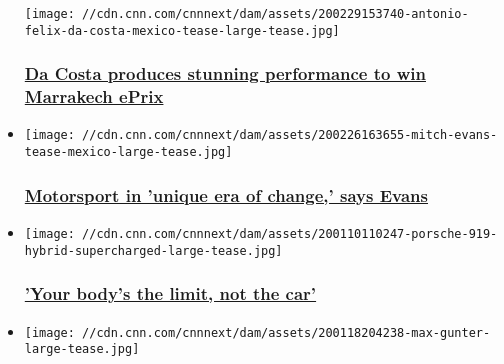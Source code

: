\begin{itemize}
  \texttt{[image: //cdn.cnn.com/cnnnext/dam/assets/200229153740-antonio-felix-da-costa-mexico-tease-large-tease.jpg]}

  \hypertarget{da-costa-produces-stunning-performance-to-win-marrakech-eprix}{%
  \subsubsection{\texorpdfstring{\href{/2020/02/29/motorsport/marrakech-eprix-formula-e-supercharged-spt-intl/index.html}{Da
  Costa produces stunning performance to win Marrakech
  ePrix}}{Da Costa produces stunning performance to win Marrakech ePrix}}\label{da-costa-produces-stunning-performance-to-win-marrakech-eprix}}
\item
  \href{/2020/02/28/motorsport/mitch-evans-formula-e-marrakech-eprix-supercharged-preview-spt-intl/index.html}{}

  \texttt{[image: //cdn.cnn.com/cnnnext/dam/assets/200226163655-mitch-evans-tease-mexico-large-tease.jpg]}

  \hypertarget{motorsport-in-unique-era-of-change-says-evans}{%
  \subsubsection{\texorpdfstring{\href{/2020/02/28/motorsport/mitch-evans-formula-e-marrakech-eprix-supercharged-preview-spt-intl/index.html}{Motorsport
  in 'unique era of change,' says
  Evans}}{Motorsport in 'unique era of change,' says Evans}}\label{motorsport-in-unique-era-of-change-says-evans}}
\item
  \href{/2020/01/15/sport/porsche-formula-e-supercharged-neel-jani-andre-lotterer-spt-intl/index.html}{}

  \texttt{[image: //cdn.cnn.com/cnnnext/dam/assets/200110110247-porsche-919-hybrid-supercharged-large-tease.jpg]}

  \hypertarget{your-bodys-the-limit-not-the-car}{%
  \subsubsection{\texorpdfstring{\href{/2020/01/15/sport/porsche-formula-e-supercharged-neel-jani-andre-lotterer-spt-intl/index.html}{'Your
  body's the limit, not the
  car'}}{'Your body's the limit, not the car'}}\label{your-bodys-the-limit-not-the-car}}
\item
  \href{/2020/01/18/sport/formula-e-santiago-e-prix-maximilian-gnther-spt-intl/index.html}{}

  \texttt{[image: //cdn.cnn.com/cnnnext/dam/assets/200118204238-max-gunter-large-tease.jpg]}


\end{itemize}
